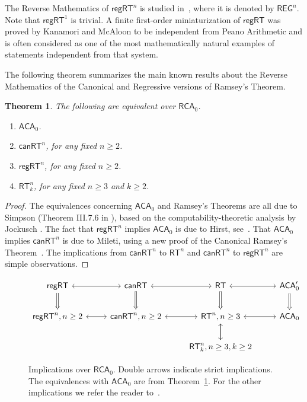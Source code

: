 \documentclass[a4paper,11pt]{article}
\newtheorem{theorem}{Theorem}
\newcommand\RCA{\mathsf{RCA}}
\newcommand\ACA{\mathsf{ACA}}
\newcommand\RT{\mathsf{RT}}
\newcommand\REG{\mathsf{regRT}}
\newcommand\CAN{\mathsf{canRT}}
\begin{document}
The Reverse Mathematics of $\REG^n$ is studied in~\cite{Mil:08}, where it is denoted
by $\mathsf{REG}^n$. Note that $\REG^1$ is trivial. 
A finite first-order miniaturization of $\REG$ was proved by Kanamori and McAloon \cite{Kan-McA:87} to be independent
from Peano Arithmetic and is often considered as one of the most mathematically natural 
examples of statements independent from that system. 

The following theorem summarizes the main known results about the Reverse Mathematics of the Canonical and Regressive versions of Ramsey's Theorem.

\begin{theorem}\label{thm:mileti}
The following are equivalent over $\RCA_0$.
\begin{enumerate}
\item $\ACA_0$.
\item $\CAN^n$, for any fixed $n \geq 2$.
\item $\REG^n$, for any fixed $n \geq 2$.
\item $\RT^n_k$, for any fixed $n \geq 3$ and $k\geq 2$.
\end{enumerate}
\end{theorem}

\begin{proof}
The equivalences concerning $\ACA_0$ and Ramsey's Theorems are all due to Simpson 
(Theorem III.7.6 in \cite{Sim:SOSOA}), based on the 
computability-theoretic analysis by Jockusch \cite{Joc:72}. 
The fact that $\REG^n$ implies $\ACA_0$ is due to Hirst, see~\cite{Hir:phd}.  
That $\ACA_0$ implies $\CAN^n$ is due to Mileti, using a new proof of the Canonical Ramsey's Theorem~\cite{Mil:08}. 
The implications from $\CAN^n$ to $\RT^n$ and $\CAN^n$ to $\REG^n$ are simple observations. 
\end{proof}

\begin{figure}
\centering
\[\begin{tikzcd}[row sep=2em,column sep=2.5em]
\REG \arrow[d, Rightarrow] \arrow[r] &  \arrow[l] \CAN  \arrow[d, Rightarrow] \arrow[r] & \arrow[l] \RT \arrow[r] \arrow[d, Rightarrow] & \arrow[l] \ACA_0' \arrow[d, Rightarrow]\\
\REG^n, n\geq 2  \arrow[r] & \arrow[l] \CAN^n, n\geq 2 \arrow[r] &  \arrow[l] \RT^n, n\geq 3  \arrow[d] \arrow[r] & \ACA_0 \arrow[l]\\
& & \arrow[u] \RT^n_k, n\geq 3, k\geq 2 &
\end{tikzcd}\]
\caption{Implications over $\RCA_0$. Double arrows indicate strict implications. The equivalences with $\ACA_0$ are from 
Theorem~\ref{thm:mileti}. For the other implications we refer the reader to~\cite{Mil:08}.} \label{fig:implicationsREG}
\end{figure}
\end{document}
